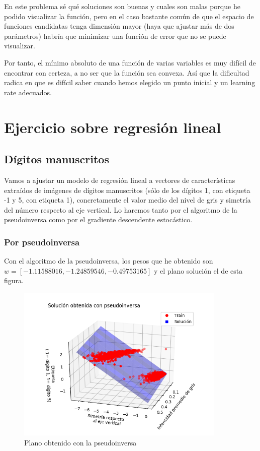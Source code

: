 \documentclass[a4]{article}
\begin{document}
En este problema sé qué soluciones son buenas y cuales son malas porque he podido visualizar la función, pero en el caso
bastante común de que el espacio de funciones candidatas tenga dimensión mayor (haya que ajustar más de dos parámetros)
habría que minimizar una función de error que no se puede visualizar.

Por tanto, el mínimo absoluto de una función de
varias variables es muy difícil de encontrar con certeza, a no ser que la
función sea convexa. Así que la dificultad radica en que es difícil saber cuando
hemos elegido un punto inicial y un learning rate adecuados.


\section{Ejercicio sobre regresión lineal}

\subsection{Dígitos manuscritos}

Vamos a ajustar un modelo de regresión lineal a vectores de características
extraídos de imágenes de dígitos manuscritos (sólo de los dígitos 1, con
etiqueta -1 y 5, con etiqueta 1), concretamente el valor medio del nivel de
gris y simetría del número respecto al eje vertical. Lo haremos tanto por el 
algoritmo de la pseudoinversa como por el gradiente descendente estocástico.

\newpage

\subsubsection{Por pseudoinversa}
Con el algoritmo de la pseudoinversa, los pesos que he obtenido son
$w = [-1.11588016, -1.24859546, -0.49753165]$ y el plano solución el de esta
figura.

\vspace{-4mm}

\begin{figure}[H]
    \centering    
    \includegraphics[width=100mm]{imgs/digitos-pinv.png}
    \caption{Plano obtenido con la pseudoinversa}
    \label{fig:digitos-pinv}
\end{figure}
\end{document}
